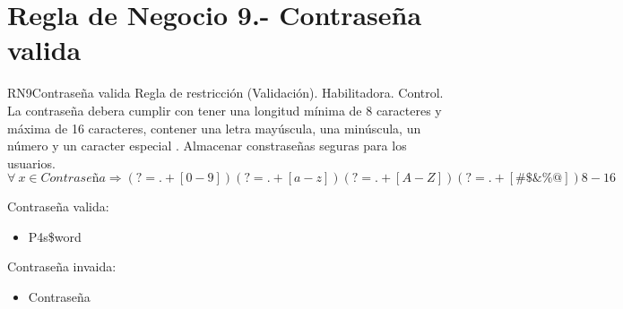 \section{Regla de Negocio 9.- Contraseña valida}

\begin{BussinesRule}{RN9}{Contraseña valida}
	\BRitem[Tipo:] Regla de restricción (Validación).
	\BRitem[Clase:] Habilitadora. 
	\BRitem[Nivel:] Control. %
	\BRitem[Descripción:] La contraseña debera cumplir con tener una longitud mínima de 8 caracteres y máxima de 16 caracteres, contener una letra mayúscula, una minúscula, un número y un caracter especial \cite{contra}.
	\BRitem[Motivación:] Almacenar constraseñas seguras para los usuarios. 
	\BRitem[Sentencia:] $\forall\ x \in Contraseña \Rightarrow     {(?=.+[0-9])(?=.+[a-z])(?=.+[A-Z])(?=.+[\#\$\&\%@])} {8-16}$
	
		 Contraseña valida:		
        \begin{itemize}
        	\item P4s\$word
        \end{itemize}
	
	 Contraseña invaida:
		\begin{itemize}
        	\item Contraseña   
			\end{itemize}
\end{BussinesRule}
